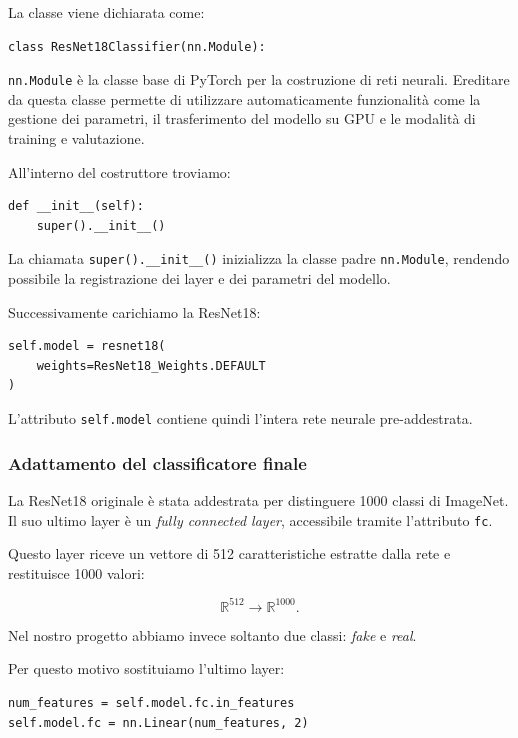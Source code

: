 \documentclass[10pt,a4paper,oneside]{book}
\begin{document}
La classe viene dichiarata come:

\begin{verbatim}
class ResNet18Classifier(nn.Module):
\end{verbatim}

\texttt{nn.Module} è la classe base di PyTorch per la
costruzione di reti neurali. Ereditare da questa classe
permette di utilizzare automaticamente funzionalità
come la gestione dei parametri, il trasferimento del
modello su GPU e le modalità di training e valutazione.

All'interno del costruttore troviamo:

\begin{verbatim}
def __init__(self):
    super().__init__()
\end{verbatim}

La chiamata \texttt{super().\_\_init\_\_()} inizializza
la classe padre \texttt{nn.Module}, rendendo possibile
la registrazione dei layer e dei parametri del modello.

Successivamente carichiamo la ResNet18:

\begin{verbatim}
self.model = resnet18(
    weights=ResNet18_Weights.DEFAULT
)
\end{verbatim}

L'attributo \texttt{self.model} contiene quindi
l'intera rete neurale pre-addestrata.

\subsubsection{Adattamento del classificatore finale}

La ResNet18 originale è stata addestrata per distinguere
1000 classi di ImageNet. Il suo ultimo layer è un
\textit{fully connected layer}, accessibile tramite
l'attributo \texttt{fc}.

Questo layer riceve un vettore di 512 caratteristiche
estratte dalla rete e restituisce 1000 valori:

\[
\mathbb{R}^{512}
\longrightarrow
\mathbb{R}^{1000}.
\]

Nel nostro progetto abbiamo invece soltanto due classi:
\textit{fake} e \textit{real}.

Per questo motivo sostituiamo l'ultimo layer:

\begin{verbatim}
num_features = self.model.fc.in_features
self.model.fc = nn.Linear(num_features, 2)
\end{verbatim}
\end{document}
